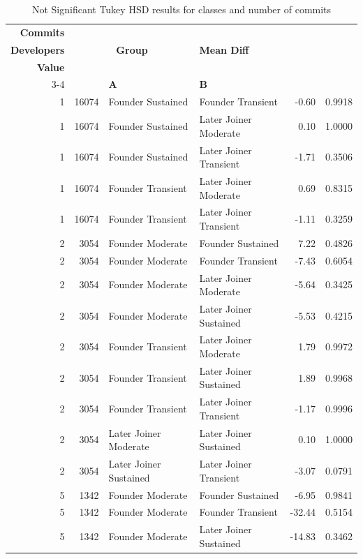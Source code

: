 \begin{table}[H]
\centering
\setlength{\tabcolsep}{2pt}
\caption[Not Significant Tukey HSD Results for classes]{Not Significant Tukey HSD results for classes and number of commits}
\begin{tabular}{r r l l r r}
\toprule
\textbf{Commits} & \makecell[t]{\textbf{Number of}\\\textbf{Developers}} & \multicolumn{2}{c}{\textbf{Group}} & \textbf{Mean Diff} & \makecell[t]{\textbf{Adj $P$}\\\textbf{Value}} \\ 
\cmidrule(lr){3-4}
 &  & \textbf{A} & \textbf{B} &  &  \\ 
\midrule
1 & 16074 & Founder Sustained & Founder Transient & -0.60 & 0.9918 \\ 
1 & 16074 & Founder Sustained & Later Joiner Moderate & 0.10 & 1.0000 \\ 
1 & 16074 & Founder Sustained & Later Joiner Transient & -1.71 & 0.3506 \\ 
1 & 16074 & Founder Transient & Later Joiner Moderate & 0.69 & 0.8315 \\ 
1 & 16074 & Founder Transient & Later Joiner Transient & -1.11 & 0.3259 \\ 
2 & 3054 & Founder Moderate & Founder Sustained & 7.22 & 0.4826 \\ 
2 & 3054 & Founder Moderate & Founder Transient & -7.43 & 0.6054 \\ 
2 & 3054 & Founder Moderate & Later Joiner Moderate & -5.64 & 0.3425 \\ 
2 & 3054 & Founder Moderate & Later Joiner Sustained & -5.53 & 0.4215 \\ 
2 & 3054 & Founder Transient & Later Joiner Moderate & 1.79 & 0.9972 \\ 
2 & 3054 & Founder Transient & Later Joiner Sustained & 1.89 & 0.9968 \\ 
2 & 3054 & Founder Transient & Later Joiner Transient & -1.17 & 0.9996 \\ 
2 & 3054 & Later Joiner Moderate & Later Joiner Sustained & 0.10 & 1.0000 \\ 
2 & 3054 & Later Joiner Sustained & Later Joiner Transient & -3.07 & 0.0791 \\ 
5 & 1342 & Founder Moderate & Founder Sustained & -6.95 & 0.9841 \\ 
5 & 1342 & Founder Moderate & Founder Transient & -32.44 & 0.5154 \\ 
5 & 1342 & Founder Moderate & Later Joiner Sustained & -14.83 & 0.3462 \\ 

\end{tabular}
\end{table}
